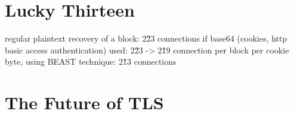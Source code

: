 \documentclass[10pt,conference,a4paper]{IEEEtran}
\begin{document}
\section{Lucky Thirteen}
\label{sec:lucky}
regular plaintext recovery of a block: 2\^23 connections
if base64 (cookies, http basic access authentication) used: 2\^23 -> 2\^19 connection per block
per cookie byte, using BEAST technique: 2\^13 connections

\section{The Future of TLS}
\label{sec:future}



\end{document}
